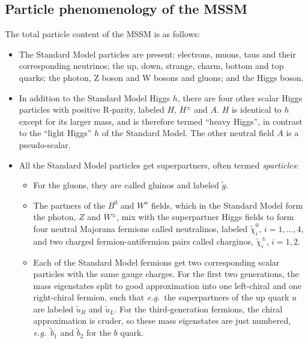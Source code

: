 \subsection{Particle phenomenology of the MSSM}
The total particle content of the MSSM is as follows: 
\begin{itemize}
	\item The Standard Model particles are present: electrons, muons, taus and their corresponding neutrinos; the up, down, strange, charm, bottom and top quarks; the photon, Z boson and W bosons and gluons; and the Higgs boson.
	\item In addition to the Standard Model Higgs $h$, there are four other scalar Higgs particles with positive R-parity, labeled $H$, $H^\pm$ and $A$. $H$ is identical to $h$ except for its larger mass, and is therefore termed ``heavy Higgs'', in contrast to the ``light Higgs'' $h$ of the Standard Model. The other neutral field $A$ is a pseudo-scalar.
	\item All the Standard Model particles get superpartners, often termed {\it sparticles}:
	\begin{itemize}
	 	\item For the gluons, they are called gluinos and labeled $\tilde g$. 
	 	\item The partners of the $B^0$ and $W^a$ fields, which in the Standard Model form the photon, $Z$ and $W^\pm$, mix with the superpartner Higgs fields to form four neutral Majorana fermions called neutralinos, labeled $\tilde\chi_i^0$, $i=1,...,4$, and two charged fermion-antifermion pairs called charginos, $\tilde\chi_i^\pm$, $i=1,2$. 
	 	\item Each of the Standard Model fermions get two corresponding scalar particles with the same gauge charges. For the first two generations, the mass eigenstates split to good approximation into one left-chiral and one right-chiral fermion, such that {\it e.g.}\ the superpartners of the up quark $u$ are labeled $\tilde u_R$ and $\tilde u_L$. For the third-generation fermions, the chiral approximation is cruder, so these mass eigenstates are just numbered, {\it e.g.}\ $\tilde b_1$ and $\tilde b_2$ for the $b$ quark. 
	 \end{itemize} 
 \end{itemize}


